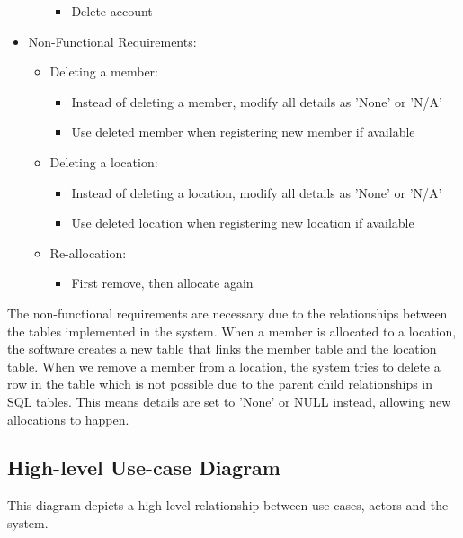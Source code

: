 \documentclass[11pt,a4paper]{article}
\begin{document}
\begin{itemize}
\begin{itemize}
\begin{itemize}
                    \item Delete account
                \end{itemize}
        \end{itemize}
    \item Non-Functional Requirements:
        \begin{itemize}
            \item Deleting a member:
                \begin{itemize}
                    \item Instead of deleting a member, modify all details as 'None' or 'N/A'
                    \item Use deleted member when registering new member if available
                \end{itemize}
            \item Deleting a location:
                \begin{itemize}
                    \item Instead of deleting a location, modify all details as 'None' or 'N/A'
                    \item Use deleted location when registering new location if available
                \end{itemize}
            \item Re-allocation:
                \begin{itemize}
                    \item First remove, then allocate again
                \end{itemize}
        \end{itemize}
\end{itemize}

The non-functional requirements are necessary due to the relationships between the tables implemented in the system. When a member is allocated to a location, the software creates a new table that links the member table and the location table. When we remove a member from a location, the system tries to delete a row in the table which is not possible due to the parent child relationships in SQL tables. This means details are set to 'None' or NULL instead, allowing new allocations to happen.

\subsection{High-level Use-case Diagram}
This diagram depicts a high-level relationship between use cases, actors and the system.
\end{document}
